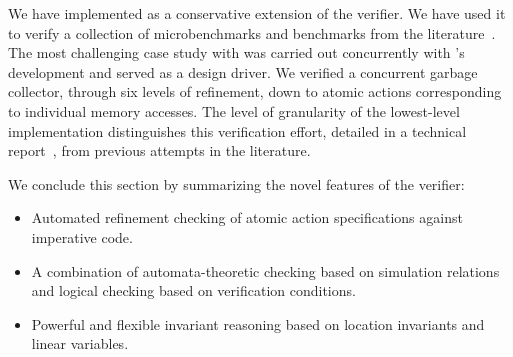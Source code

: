 We have implemented \civl as a conservative extension of the \boogie verifier.  
We have used it to verify a collection of microbenchmarks and benchmarks from the 
literature~\cite{Blumofe1999,ElmasQT09,ElmasTQ05,FarzanKP14,FlanaganQ03,Herlihy2008}. 
The most challenging case study with \civl was carried out concurrently with \civl's development and served as a design driver. 
We verified a concurrent garbage collector, through six levels of refinement, 
down to atomic actions corresponding to individual memory accesses. 
The level of granularity of the lowest-level implementation distinguishes this verification effort, 
detailed in a technical report~\cite{gc-techreport}, from previous attempts in the literature. 

We conclude this section by summarizing the novel features of the \civl verifier:
\begin{itemize}
\item Automated refinement checking of atomic action specifications against imperative code.
\item A combination of automata-theoretic checking based on simulation relations and logical checking based on verification conditions.
\item Powerful and flexible invariant reasoning based on location invariants and linear variables.
\end{itemize}
